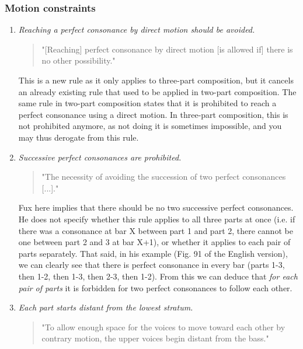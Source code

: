 \subsubsection{Motion constraints}
\begin{enumerate}[wide, label=\bfseries 1.P\arabic*]
    \item\label{rule:direct-to-p-cons} \reddot \textit{Reaching a perfect consonance by direct motion should be avoided.}

    \begin{quotation}
    "[Reaching] perfect consonance by direct motion [is allowed if] there is no other possibility."
    \textcite[p.77]{GaPEng}
    \end{quotation}

    This is a new rule as it only applies to three-part composition, but it cancels an already existing rule that used to be applied in two-part composition. The same rule in two-part composition states that it is prohibited to reach a perfect consonance using a direct motion. In three-part composition, this is not prohibited anymore, as not doing it is sometimes impossible, and you may thus derogate from this rule.

\setcounter{enumi}{3} %
    \item\label{rule:succ-p-cons} \reddot  \textit{Successive perfect consonances are prohibited.}

    \begin{quotation}
    "The necessity of avoiding the succession of two perfect consonances [...]."
    \textcite[p.72]{GaPEng}
    \end{quotation}

    Fux here implies that there should be no two successive perfect consonances. He does not specify whether this rule applies to all three parts at once (i.e. if there was a consonance at bar X between part 1 and part 2, there cannot be one between part 2 and 3 at bar X+1), or whether it applies to each pair of parts separately. That said, in his example (Fig. 91 of the English version), we can clearly see that there is perfect consonance in every bar (parts 1-3, then 1-2, then 1-3, then 2-3, then 1-2). From this we can deduce that \textit{for each pair of parts} it is forbidden for two perfect consonances to follow each other.
    
    \item\label{rule:start-distant} \reddot \textit{Each part starts distant from the lowest stratum.}

    \begin{quotation}
    "To allow enough space for the voices to move toward each other by contrary motion, the upper voices begin distant from the bass."
    \textcite[p.75]{GaPEng}
    \end{quotation}


\end{enumerate}
